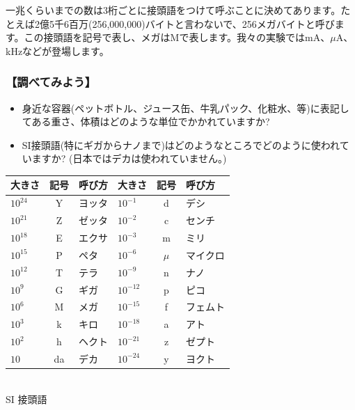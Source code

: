 一兆くらいまでの数は3桁ごとに接頭語をつけて呼ぶことに決めてあります。たとえば2億5千6百万(256,000,000)バイトと言わないで、256メガバイトと呼びます。この接頭語を記号で表し、メガはMで表します。我々の実験ではmA、$\mu$A、kHzなどが登場します。

\subsubsection*{【調べてみよう】}

\begin{itemize}

\item 身近な容器(ペットボトル、ジュース缶、牛乳パック、化粧水、等)に表記してある重さ、体積はどのような単位でかかれていますか?

\item SI接頭語(特にギガからナノまで)はどのようなところでどのように使われていますか? (日本ではデカは使われていません。)

\end{itemize}

\begin{tabular}{|l|c|l|l|c|l|}
\hline
大きさ&記号&呼び方&大きさ&記号&呼び方\\
\hline
$10^{24}$&Y&ヨッタ&$10^{-1}$&d&デシ\\
$10^{21}$&Z&ゼッタ&$10^{-2}$&c&センチ\\
$10^{18}$&E&エクサ&$10^{-3}$&m&ミリ\\
$10^{15}$&P&ペタ&$10^{-6}$&$\mu$&マイクロ\\
$10^{12}$&T&テラ&$10^{-9}$&n&ナノ\\
$10^{9}$&G&ギガ&$10^{-12}$&p&ピコ\\
$10^{6}$&M&メガ&$10^{-15}$&f&フェムト\\
$10^{3}$&k&キロ&$10^{-18}$&a&アト\\
$10^{2}$&h&ヘクト&$10^{-21}$&z&ゼプト\\
$10$&da&デカ&$10^{-24}$&y&ヨクト\\
\hline
\end{tabular}\\
\quad SI 接頭語

\vspace*{1cm}

